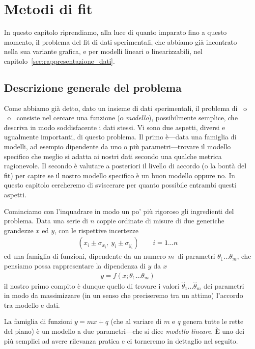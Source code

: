 \chapter{Metodi di fit}
\label{sec:metodi_di_fit}

In questo capitolo riprendiamo, alla luce di quanto imparato fino a questo
momento, il problema del fit di dati sperimentali, che abbiamo già incontrato
nella sua variante grafica, e per modelli lineari o linearizzabili, nel
capitolo~\ref{sec:rappresentazione_dati}.


\section{Descrizione generale del problema}

Come abbiamo già detto, dato un insieme di dati sperimentali, il problema di
\fit\ o \bestfit\ o \fitting\ consiste nel cercare una funzione (o \emph{modello}),
possibilmente semplice, che descriva in modo soddisfacente i dati stessi.
Vi sono due aspetti, diversi e ugualmente importanti, di questo problema.
Il primo è---data una famiglia di modelli, ad esempio dipendente da uno o più
parametri---trovare il modello specifico che meglio si adatta ai nostri dati
secondo una qualche metrica ragionevole.
Il secondo è valutare a posteriori il livello di accordo (o la bontà del
fit) per capire se il nostro modello specifico è un buon modello oppure no.
In questo capitolo cercheremo di sviscerare per quanto possibile entrambi
questi aspetti.

Cominciamo con l'inquadrare in modo un po' più rigoroso gli ingredienti del
problema. Data una serie di $n$ coppie ordinate di misure di due generiche
grandezze $x$ ed $y$, con le rispettive incertezze
\begin{align*}
  (x_i \pm \sigma_{x_i},~y_i \pm \sigma_{y_i}) \qquad i = 1 \ldots n
\end{align*}
ed una famiglia di funzioni, dipendente da un numero $m$~di parametri
$\theta_1 \ldots \theta_m$, che pensiamo possa rappresentare la dipendenza di
$y$ da $x$
\begin{align*}
  y = f(x; \theta_1 \ldots \theta_m)
\end{align*}
il nostro primo compito è dunque quello di trovare i valori
$\hat{\theta}_1 \ldots \hat{\theta}_m$ dei parametri in modo da massimizzare
(in un senso che preciseremo tra un attimo) l'accordo tra modello e dati.

\begin{examplebox}
  \begin{example}
    La famiglia di funzioni $y = mx + q$ (che al variare di $m$ e $q$ genera
    tutte le rette del piano) è un modello a due parametri---che si dice
    \emph{modello lineare}. \`E uno dei più semplici ad avere rilevanza
    pratica e ci torneremo in dettaglio nel seguito.
  \end{example}
\end{examplebox}


